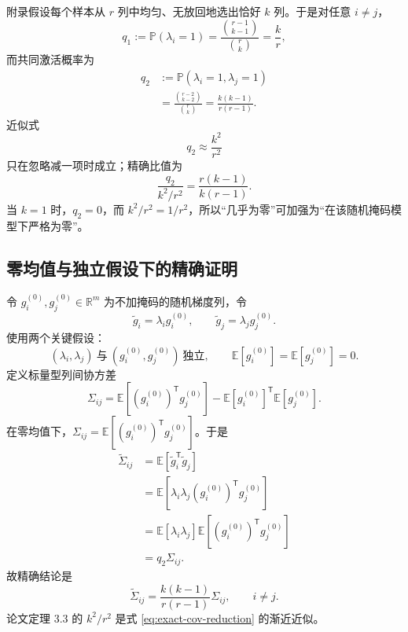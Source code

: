 \documentclass[11pt]{article}
\numberwithin{equation}{section}
\newcommand{\R}{\mathbb{R}}
\newcommand{\E}{\mathbb{E}}
\newcommand{\Pp}{\mathbb{P}}
\newcommand{\1}{\mathbf{1}}
\begin{document}
附录假设每个样本从 $r$ 列中均匀、无放回地选出恰好 $k$ 列。于是对任意 $i\ne j$，
\begin{equation}
  q_1:=\Pp(\lambda_i=1)
  =\frac{\binom{r-1}{k-1}}{\binom rk}
  =\frac kr,
  \label{eq:q1}
\end{equation}
而共同激活概率为
\begin{align}
  q_2&:=\Pp(\lambda_i=1,\lambda_j=1)\\
  &=\frac{\binom{r-2}{k-2}}{\binom rk}
  =\frac{k(k-1)}{r(r-1)}.
  \label{eq:q2}
\end{align}
近似式
\begin{equation}
  q_2\approx\frac{k^2}{r^2}
\end{equation}
只在忽略减一项时成立；精确比值为
\begin{equation}
  \frac{q_2}{k^2/r^2}
  =\frac{r(k-1)}{k(r-1)}.
\end{equation}
当 $k=1$ 时，$q_2=0$，而 $k^2/r^2=1/r^2$，所以“几乎为零”可加强为“在该随机掩码模型下严格为零”。

\subsection{零均值与独立假设下的精确证明}

令 $g_i^{(0)},g_j^{(0)}\in\R^m$ 为不加掩码的随机梯度列，令
\begin{equation}
  \widetilde g_i=\lambda_i g_i^{(0)},
  \qquad
  \widetilde g_j=\lambda_j g_j^{(0)}.
\end{equation}
使用两个关键假设：
\begin{equation}
  (\lambda_i,\lambda_j)\ \text{与}\ (g_i^{(0)},g_j^{(0)})\ \text{独立},
  \qquad
  \E[g_i^{(0)}]=\E[g_j^{(0)}]=0.
  \label{eq:cov-assumptions}
\end{equation}
定义标量型列间协方差
\begin{equation}
  \Sigma_{ij}
  =\E[(g_i^{(0)})^{\mathsf{T}}g_j^{(0)}]
  -\E[g_i^{(0)}]^{\mathsf{T}}\E[g_j^{(0)}].
\end{equation}
在零均值下，$\Sigma_{ij}=\E[(g_i^{(0)})^{\mathsf{T}}g_j^{(0)}]$。于是
\begin{align}
  \widetilde\Sigma_{ij}
  &=\E[\widetilde g_i^{\mathsf{T}}\widetilde g_j]\\
  &=\E[\lambda_i\lambda_j
        (g_i^{(0)})^{\mathsf{T}}g_j^{(0)}]\\
  &=\E[\lambda_i\lambda_j]
    \E[(g_i^{(0)})^{\mathsf{T}}g_j^{(0)}]\\
  &=q_2\Sigma_{ij}.
\end{align}
故精确结论是
\begin{equation}
  \boxed{
  \widetilde\Sigma_{ij}
  =\frac{k(k-1)}{r(r-1)}\Sigma_{ij},
  \qquad i\ne j.}
  \label{eq:exact-cov-reduction}
\end{equation}
论文定理 3.3 的 $k^2/r^2$ 是式 \eqref{eq:exact-cov-reduction} 的渐近近似。
\end{document}

